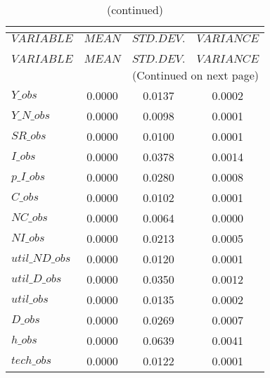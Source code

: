  
\begin{center}
\begin{longtable}{lccc} 
\caption{THEORETICAL MOMENTS}\\
 \label{Table:th_moments}\\
\toprule 
$VARIABLE       $	 & 	 $         MEAN$	 & 	 $    STD. DEV.$	 & 	 $     VARIANCE$\\
\midrule \endfirsthead 
\caption{(continued)}\\
 \toprule \\ 
$VARIABLE       $	 & 	 $         MEAN$	 & 	 $    STD. DEV.$	 & 	 $     VARIANCE$\\
\midrule \endhead 
\midrule \multicolumn{4}{r}{(Continued on next page)} \\ \bottomrule \endfoot 
\bottomrule \endlastfoot 
$Y\_obs         $	 & 	       0.0000	 & 	       0.0137	 & 	       0.0002 \\ 
$Y\_N\_obs      $	 & 	       0.0000	 & 	       0.0098	 & 	       0.0001 \\ 
$SR\_obs        $	 & 	       0.0000	 & 	       0.0100	 & 	       0.0001 \\ 
$I\_obs         $	 & 	       0.0000	 & 	       0.0378	 & 	       0.0014 \\ 
$p\_I\_obs      $	 & 	       0.0000	 & 	       0.0280	 & 	       0.0008 \\ 
$C\_obs         $	 & 	       0.0000	 & 	       0.0102	 & 	       0.0001 \\ 
$NC\_obs        $	 & 	       0.0000	 & 	       0.0064	 & 	       0.0000 \\ 
$NI\_obs        $	 & 	       0.0000	 & 	       0.0213	 & 	       0.0005 \\ 
$util\_ND\_obs  $	 & 	       0.0000	 & 	       0.0120	 & 	       0.0001 \\ 
$util\_D\_obs   $	 & 	       0.0000	 & 	       0.0350	 & 	       0.0012 \\ 
$util\_obs      $	 & 	       0.0000	 & 	       0.0135	 & 	       0.0002 \\ 
$D\_obs         $	 & 	       0.0000	 & 	       0.0269	 & 	       0.0007 \\ 
$h\_obs         $	 & 	       0.0000	 & 	       0.0639	 & 	       0.0041 \\ 
$tech\_obs      $	 & 	       0.0000	 & 	       0.0122	 & 	       0.0001 \\ 
\end{longtable}
 \end{center}
